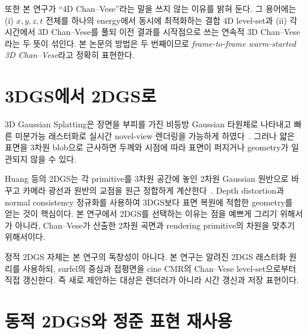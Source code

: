 

또한 본 연구가 ``4D Chan--Vese''라는 말을 쓰지 않는 이유를 밝혀 둔다. 그 용어에는
(i) $x,y,z,t$ 전체를 하나의 energy에서 동시에 최적화하는 결합 4D level-set과
(ii) 각 시간에서 3D Chan--Vese를 풀되 이전 결과를 시작점으로 쓰는 연속적 3D
Chan--Vese라는 두 뜻이 섞인다. 본 논문의 방법은 두 번째이므로
\emph{frame-to-frame warm-started 3D Chan--Vese}라고 정확히 표현한다.

\section{3DGS에서 2DGS로}

3D Gaussian Splatting은 장면을 부피를 가진 비등방 Gaussian 타원체로 나타내고 빠른
미분가능 래스터화로 실시간 novel-view 렌더링을 가능하게 하였다~\citep{kerbl2023_3dgs}.
그러나 얇은 표면을 3차원 blob으로 근사하면 두께와 시점에 따라 표면이 퍼지거나
geometry가 일관되지 않을 수 있다.

Huang 등의 2DGS는 각 primitive를 3차원 공간에 놓인 2차원 Gaussian 원반으로 바꾸고
카메라 광선과 원반의 교점을 원근 정합하게 계산한다~\citep{huang2024_2dgs}. Depth
distortion과 normal consistency 정규화를 사용하여 3DGS보다 표면 복원에 적합한
geometry를 얻는 것이 핵심이다. 본 연구에서 2DGS를 선택하는 이유는 점을 예쁘게
그리기 위해서가 아니라, Chan--Vese가 산출한 2차원 곡면과 rendering primitive의
차원을 맞추기 위해서이다.

정적 2DGS 자체는 본 연구의 독창성이 아니다. 본 연구는 알려진 2DGS 래스터화 원리를
사용하되, surfel의 중심과 접평면을 cine CMR의 Chan--Vese level-set으로부터 직접
갱신한다. 즉 새로 제안하는 대상은 렌더러가 아니라 시간 갱신과 저장 표현이다.

\section{동적 2DGS와 정준 표현 재사용}

